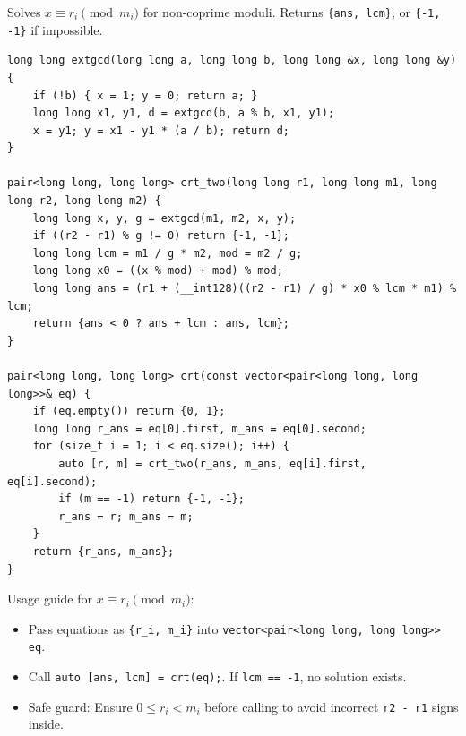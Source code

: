 
Solves $x \equiv r_i \pmod{m_i}$ for non-coprime moduli. Returns \lstinline|{ans, lcm}|, or \lstinline|{-1, -1}| if impossible.

\begin{lstlisting}
long long extgcd(long long a, long long b, long long &x, long long &y) {
    if (!b) { x = 1; y = 0; return a; }
    long long x1, y1, d = extgcd(b, a % b, x1, y1);
    x = y1; y = x1 - y1 * (a / b); return d;
}

pair<long long, long long> crt_two(long long r1, long long m1, long long r2, long long m2) {
    long long x, y, g = extgcd(m1, m2, x, y);
    if ((r2 - r1) % g != 0) return {-1, -1};
    long long lcm = m1 / g * m2, mod = m2 / g;
    long long x0 = ((x % mod) + mod) % mod;
    long long ans = (r1 + (__int128)((r2 - r1) / g) * x0 % lcm * m1) % lcm;
    return {ans < 0 ? ans + lcm : ans, lcm};
}

pair<long long, long long> crt(const vector<pair<long long, long long>>& eq) {
    if (eq.empty()) return {0, 1};
    long long r_ans = eq[0].first, m_ans = eq[0].second;
    for (size_t i = 1; i < eq.size(); i++) {
        auto [r, m] = crt_two(r_ans, m_ans, eq[i].first, eq[i].second);
        if (m == -1) return {-1, -1};
        r_ans = r; m_ans = m;
    }
    return {r_ans, m_ans};
}
\end{lstlisting}

Usage guide for $x \equiv r_i \pmod{m_i}$:
\begin{itemize}
    \item Pass equations as \lstinline|{r_i, m_i}| into \lstinline|vector<pair<long long, long long>> eq|.
    \item Call \lstinline|auto [ans, lcm] = crt(eq);|. If \lstinline|lcm == -1|, no solution exists.
    \item Safe guard: Ensure $0 \le r_i < m_i$ before calling to avoid incorrect \lstinline|r2 - r1| signs inside.
\end{itemize}
